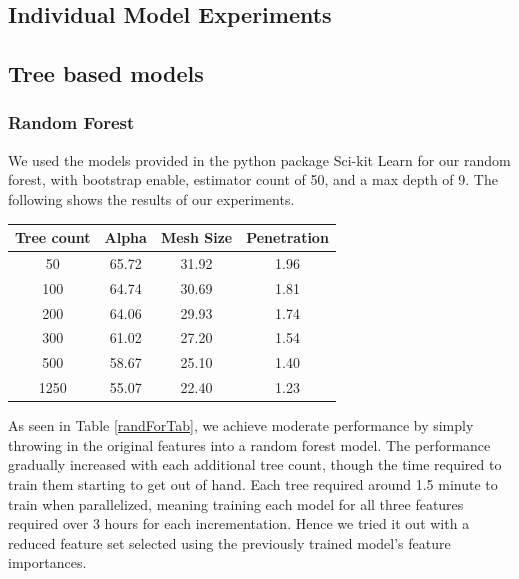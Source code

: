 \documentclass[a4paper, 12pt]{article}
\begin{document}
\begin{multicols}{2}
        \section{Individual Model Experiments}        
            \subsection{Tree based models}
                \subsubsection{Random Forest}
                We used the models provided in the python package Sci-kit Learn \cite{scikit-learn} for our random forest, with bootstrap enable, estimator count of 50, and a max depth of 9. The following shows the results of our experiments.
                \begin{center}
                    \begin{tabular}{c|ccc}
                        Tree count & Alpha & Mesh Size & Penetration\\
                        \hline
                        50 & 65.72 & 31.92 & 1.96 \\
                        100 & 64.74 & 30.69 & 1.81 \\
                        200 & 64.06 & 29.93 & 1.74 \\
                        300 & 61.02 & 27.20 & 1.54 \\
                        500 & 58.67 & 25.10 & 1.40 \\
                        1250 & 55.07 & 22.40 & 1.23
                    \end{tabular}
                    \label{randForTab}
                \end{center}

                As seen in Table \ref{randForTab}, we achieve moderate performance by simply throwing in the original features into a random forest model. The performance gradually increased with each additional tree count, though the time required to train them starting to get out of hand. Each tree required around 1.5 minute to train when parallelized, meaning training each model for all three features required over 3 hours for each incrementation. Hence we tried it out with a reduced feature set selected using the previously trained model's feature importances.


\end{multicols}
\end{document}

